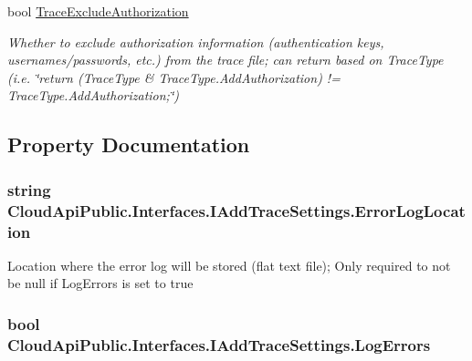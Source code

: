 \begin{DoxyCompactItemize}
bool \hyperlink{interface_cloud_api_public_1_1_interfaces_1_1_i_add_trace_settings_a29cd00532a90fca920517cfb163b0a42}{Trace\-Exclude\-Authorization}
\begin{DoxyCompactList}\small\item\em Whether to exclude authorization information (authentication keys, usernames/passwords, etc.) from the trace file; can return based on Trace\-Type (i.\-e. \char`\"{}return (\-Trace\-Type \& Trace\-Type.\-Add\-Authorization) != Trace\-Type.\-Add\-Authorization;\char`\"{}) \end{DoxyCompactList}\end{DoxyCompactItemize}


\subsection{Property Documentation}
\hypertarget{interface_cloud_api_public_1_1_interfaces_1_1_i_add_trace_settings_acdd869808512ad6cf46038e0479e7e94}{
\subsubsection[{Error\-Log\-Location}]{\setlength{\rightskip}{0pt plus 5cm}string Cloud\-Api\-Public.\-Interfaces.\-I\-Add\-Trace\-Settings.\-Error\-Log\-Location\hspace{0.3cm}{\ttfamily [get]}}}\label{interface_cloud_api_public_1_1_interfaces_1_1_i_add_trace_settings_acdd869808512ad6cf46038e0479e7e94}


Location where the error log will be stored (flat text file); Only required to not be null if Log\-Errors is set to true 

\hypertarget{interface_cloud_api_public_1_1_interfaces_1_1_i_add_trace_settings_a408aee5af8022c8d372501af301459a6}{
\subsubsection[{Log\-Errors}]{\setlength{\rightskip}{0pt plus 5cm}bool Cloud\-Api\-Public.\-Interfaces.\-I\-Add\-Trace\-Settings.\-Log\-Errors\hspace{0.3cm}{\ttfamily [get]}}}\label{interface_cloud_api_public_1_1_interfaces_1_1_i_add_trace_settings_a408aee5af8022c8d372501af301459a6}


